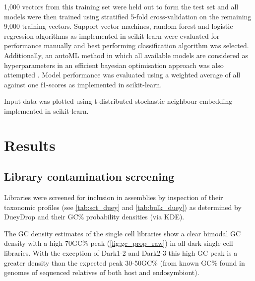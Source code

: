 1,000 vectors from this training set were held out to form the test set and all models were then trained
using stratified 5-fold cross-validation on the remaining 9,000 training vectors. 
Support vector machines, random forest and logistic regression algorithms as implemented in scikit-learn 
were evaluated for performance manually and best performing classification algorithm was selected.
Additionally, an autoML method in which all available models are considered as hyperparameters in an efficient
bayesian optimisation approach was also attempted \citep{Komer2014}. 
Model performance was evaluated using a weighted average of all against one f1-scores as implemented 
in scikit-learn.

Input data was plotted using t-distributed stochastic neighbour embedding implemented in scikit-learn.

\section{Results} 

\subsection{Library contamination screening}

Libraries were screened for inclusion in assemblies by inspection of their taxonomic
profiles (see \ref{tab:sct_duey} and \ref{tab:bulk_duey}) as determined by DueyDrop 
and their GC\% probability densities (via KDE).

The GC density estimates of the single cell libraries show a clear bimodal GC density
with a high 70GC\% peak (\ref{fig:gc_prop_raw}) in all dark single cell libraries. 
With the exception of Dark1-2 and Dark2-3 this high GC peak is a greater density
than the expected peak 30-50GC\% (from known GC\% found in genomes
of sequenced relatives of both host and endosymbiont).

